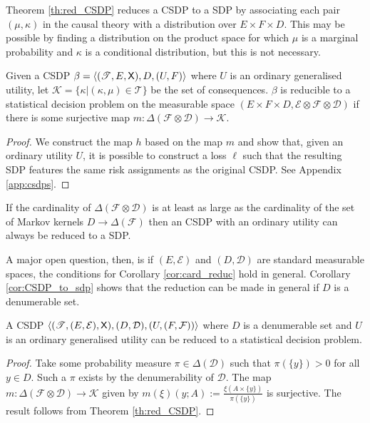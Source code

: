 Theorem \ref{th:red_CSDP} reduces a CSDP to a SDP by associating each pair $(\mu,\kappa)$ in the causal theory with a distribution over $E\times F\times D$. This may be possible by finding a distribution on the product space for which $\mu$ is a marginal probability and $\kappa$ is a conditional distribution, but this is not necessary.

\begin{theorem}\label{th:red_CSDP}
Given a CSDP $\beta=\langle (\mathscr{T},E,\mathsf{X}),D,(U,F)\rangle$ where $U$ is an ordinary generalised utility, let $\mathscr{K}=\{\kappa|(\kappa,\mu)\in \mathscr{T}\}$ be the set of consequences. $\beta$ is reducible to a statistical decision problem on the measurable space $(E\times F\times D,\mathcal{E}\otimes \mathcal{F}\otimes \mathcal{D})$ if there is some surjective map $m:\Delta(\mathcal{F}\otimes\mathcal{D})\to \mathscr{K}$.
\end{theorem}

\begin{proof}
We construct the map $h$ based on the map $m$ and show that, given an ordinary utility $U$, it is possible to construct a loss $\ell$ such that the resulting SDP features the same risk assignments as the original CSDP. See Appendix \ref{app:csdps}.
\end{proof}

\begin{corollary}\label{cor:card_reduc}
If the cardinality of $\Delta(\mathcal{F}\otimes\mathcal{D})$ is at least as large as the cardinality of the set of Markov kernels $D\to \Delta(\mathcal{F})$ then an CSDP with an ordinary utility can always be reduced to a SDP.
\end{corollary}

A major open question, then, is if $(E,\mathcal{E})$ and $(D,\mathcal{D})$ are standard measurable spaces, the conditions for Corollary \ref{cor:card_reduc} hold in general. Corollary \ref{cor:CSDP_to_sdp} shows that the reduction can be made in general if $D$ is a denumerable set.

\begin{corollary}\label{cor:CSDP_to_sdp}
A CSDP $\langle (\mathscr{T},(E,\mathcal{E}),\mathsf{X}),(D,\mathcal{D}),(U,(F,\mathcal{F}))\rangle$ where $D$ is a denumerable set and $U$ is an ordinary generalised utility can be reduced to a statistical decision problem.
\end{corollary}

\begin{proof}
Take some probability measure $\pi\in \Delta(\mathcal{D})$ such that $\pi(\{y\})>0$ for all $y\in D$. Such a $\pi$ exists by the denumerability of $\mathcal{D}$. The map $m:\Delta(\mathcal{F}\otimes\mathcal{D})\to \mathscr{K}$ given by $m(\xi)(y;A) := \frac{\xi(A\times\{y\})}{\pi(\{y\})}$ is surjective. The result follows from Theorem \ref{th:red_CSDP}.
\end{proof}